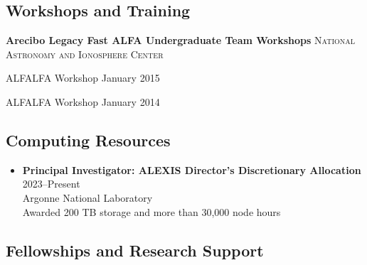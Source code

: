 \documentclass[11pt,a4paper]{article}
\begin{document}
\subsection*{Workshops and Training}

\headedsection
{\textbf{Arecibo Legacy Fast ALFA Undergraduate Team Workshops}}
{\textsc{National Astronomy and Ionosphere Center}}
{%
    \headedsubsection
    {ALFALFA Workshop}
    {January 2015}
    {}
    
    \headedsubsection
    {ALFALFA Workshop}
    {January 2014}
    {}
}

\spacedhrule{0.5em}{-0.4em}



\subsection*{Computing Resources}

\begin{itemize}[leftmargin=0em, itemsep=0.5em, label={}]
    \item \textbf{Principal Investigator: ALEXIS Director's Discretionary Allocation} \hfill 2023–Present\\
    Argonne National Laboratory\\
    Awarded 200 TB storage and more than 30,000 node hours
\end{itemize}

\subsection*{Fellowships and Research Support}
\end{document}
